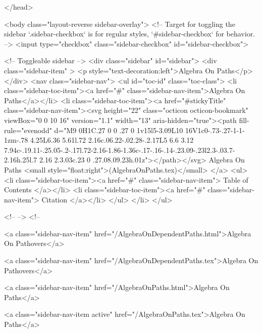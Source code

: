 </head>


  <body class="layout-reverse sidebar-overlay">
    <!-- Target for toggling the sidebar `.sidebar-checkbox` is for regular
     styles, `#sidebar-checkbox` for behavior. -->
<input type="checkbox" class="sidebar-checkbox" id="sidebar-checkbox">

<!-- Toggleable sidebar -->
<div class="sidebar" id="sidebar">
  <div class="sidebar-item" >
    <p style="text-decoration:left">Algebra On Paths</p>
  </div>
  <nav class="sidebar-nav">
    <ul id="toc-id" class="toc-class">
  <li class="sidebar-toc-item"><a href="#" class="sidebar-nav-item">Algebra On Paths</a></li>
  <li class="sidebar-toc-item"><a href="#stickyTitle" class="sidebar-nav-item"><svg height="22" class="octicon octicon-bookmark" viewBox="0 0 10 16" version="1.1" width="13" aria-hidden="true"><path fill-rule="evenodd" d="M9 0H1C.27 0 0 .27 0 1v15l5-3.09L10 16V1c0-.73-.27-1-1-1zm-.78 4.25L6.36 5.61l.72 2.16c.06.22-.02.28-.2.17L5 6.6 3.12 7.94c-.19.11-.25.05-.2-.17l.72-2.16-1.86-1.36c-.17-.16-.14-.23.09-.23l2.3-.03.7-2.16h.25l.7 2.16 2.3.03c.23 0 .27.08.09.23h.01z"></path></svg> Algebra On Paths <small style="float:right">(AlgebraOnPaths.tex)</small>
</a>
    <ul>
      <li class="sidebar-toc-item"><a href="#" class="sidebar-nav-item"> Table of Contents </a></li>
      <li class="sidebar-toc-item"><a href="#" class="sidebar-nav-item"> Citation </a></li>
    </ul>
  </li>
</ul>


    <!--  -->
    <!-- 
      
    
      
    
      
    
      
        
      
    
      
        
          <a class="sidebar-nav-item" href="/AlgebraOnDependentPaths.html">Algebra On Pathovers</a>
        
      
    
      
        
          <a class="sidebar-nav-item" href="/AlgebraOnDependentPaths.tex">Algebra On Pathovers</a>
        
      
    
      
        
          <a class="sidebar-nav-item" href="/AlgebraOnPaths.html">Algebra On Paths</a>
        
      
    
      
        
          <a class="sidebar-nav-item active" href="/AlgebraOnPaths.tex">Algebra On Paths</a>
        
